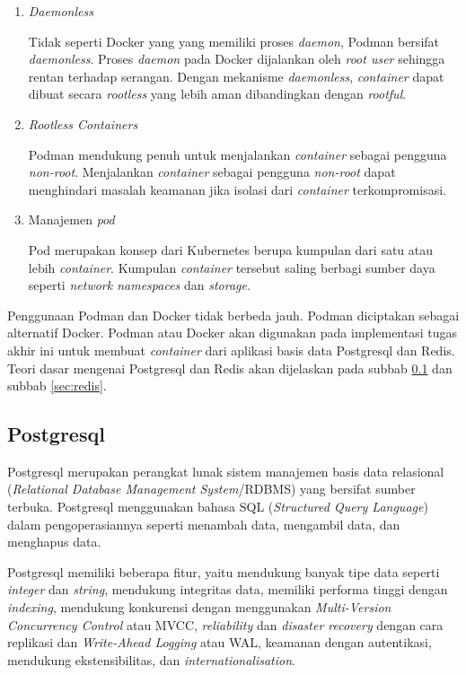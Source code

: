 \begin{enumerate}
  
  \item \emph{Daemonless}

    Tidak seperti Docker yang yang memiliki proses \emph{daemon}, Podman bersifat \emph{daemonless}.
    Proses \emph{daemon} pada Docker dijalankan oleh \emph{root user} sehingga rentan
    terhadap serangan. Dengan mekanisme \emph{daemonless}, \emph{container} dapat dibuat
    secara \emph{rootless} yang lebih aman dibandingkan dengan \emph{rootful}.

  \item \emph{Rootless Containers}

    Podman mendukung penuh untuk menjalankan \emph{container} sebagai pengguna \emph{non-root}.
    Menjalankan \emph{container} sebagai pengguna \emph{non-root} dapat menghindari masalah keamanan
    jika isolasi dari \emph{container} terkompromisasi.

  \item Manajemen \emph{pod}

    Pod merupakan konsep dari Kubernetes berupa kumpulan dari satu atau lebih \emph{container}.
    Kumpulan \emph{container} tersebut saling berbagi sumber daya seperti \emph{network namespaces}
    dan \emph{storage}.

\end{enumerate}

Penggunaan Podman dan Docker tidak berbeda jauh. Podman diciptakan sebagai alternatif Docker.
Podman atau Docker akan digunakan pada implementasi tugas akhir ini untuk membuat \emph{container}
dari aplikasi basis data Postgresql dan Redis. Teori dasar mengenai Postgresql dan Redis akan
dijelaskan pada subbab \ref{sec:postgresql} dan subbab \ref{sec:redis}.

\subsection{Postgresql}
\label{sec:postgresql}

Postgresql merupakan perangkat lunak sistem manajemen basis data relasional
(\emph{Relational Database Management System}/RDBMS) yang bersifat sumber terbuka.
Postgresql menggunakan bahasa SQL (\emph{Structured Query Language}) dalam pengoperasiannya
seperti menambah data, mengambil data, dan menghapus data.

Postgresql memiliki beberapa fitur, yaitu mendukung banyak tipe data seperti \emph{integer} dan
\emph{string}, mendukung integritas data, memiliki performa tinggi dengan \emph{indexing},
mendukung konkurensi dengan menggunakan \emph{Multi-Version Concurrency Control} atau MVCC,
\emph{reliability} dan \emph{disaster recovery} dengan cara replikasi dan \emph{Write-Ahead Logging} atau WAL,
keamanan dengan autentikasi, mendukung ekstensibilitas, dan \emph{internationalisation}.

